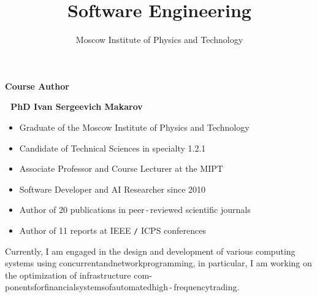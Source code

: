 \documentclass{beamer}
\begin{document}
\title{\bf Software Engineering} 

\author{Moscow Institute of Physics and Technology}

\date{}

\frame{\titlepage}



\begin{frame}{\bf Course Author}

    \textbf{\;\;\;\;\,\,\,\,PhD Ivan Sergeevich Makarov}

    \bigskip
    
    \begin{itemize}

        \item Graduate of the Moscow Institute of Physics and Technology

        \item Candidate of Technical Sciences in specialty 1.2.1

        \item Associate Professor and Course Lecturer at the MIPT

        \item Software Developer and AI Researcher since 2010

        \item Author of 20 publications in peer\,-\,reviewed scientific journals
    
        \item Author of 11 reports at IEEE \texttt{/} ICPS conferences
        
    \end{itemize}

    \begin{block}
    \justifying Currently, I am engaged in the design and development of various computing systems using concurrent\:and\:network\:programming, in particular, I am working on the optimization of infrastructure com- ponents\;for\;financial\;systems\;of\;automated\;high\,-\,frequency\;trading.
    \end{block}
    
\end{frame}
\end{document}
